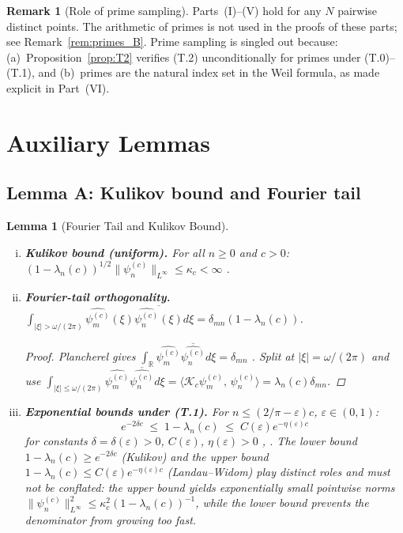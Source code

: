 \documentclass[12pt,a4paper]{amsart}
\newtheorem{lemma}[theorem]{Lemma}
\theoremstyle{definition}
\newtheorem{remark}[theorem]{Remark}
\newcommand{\Kop}{\mathcal{K}_c}
\newcommand{\Kul}{\kappa_c}
\newcommand{\psin}{\psi_n^{(c)}}
\newcommand{\norm}[1]{\|#1\|}
\newcommand{\ip}[2]{\langle #1,\, #2\rangle}
\begin{document}
\begin{remark}[Role of prime sampling]\label{rem:primes}
Parts~(I)--(V) hold for any $N$ pairwise distinct points.
The arithmetic of primes is not used in the proofs of these parts;
see Remark~\ref{rem:primes_B}.
Prime sampling is singled out because: (a)~Proposition~\ref{prop:T2}
verifies (T.2) unconditionally for primes under (T.0)--(T.1), and
(b)~primes are the natural index set in the Weil formula, as made
explicit in Part~(VI).
\end{remark}

\section{Auxiliary Lemmas}\label{sec:lemmas}

\subsection{Lemma A: Kulikov bound and Fourier tail}

\begin{lemma}[Fourier Tail and Kulikov Bound]\label{lem:A}
\begin{enumerate}[(i)]
\item \textbf{Kulikov bound (uniform).}
For all $n\geq0$ and $c>0$:
$(1-\lambda_n(c))^{1/2}\norm{\psin}_{L^\infty}\leq\Kul<\infty$
\cite[Thm.~1.1]{Kulikov2023}.

\item \textbf{Fourier-tail orthogonality.}
$\displaystyle
\int_{|\xi|>\omega/(2\pi)}
\widehat{\psi_m^{(c)}}(\xi)\overline{\widehat{\psi_n^{(c)}}(\xi)}d\xi
=\delta_{mn}(1-\lambda_n(c))$.
\begin{proof}
Plancherel gives $\int_{\mathbb{R}}\widehat{\psi_m^{(c)}}
\overline{\widehat{\psi_n^{(c)}}}d\xi=\delta_{mn}$
\cite[Thm.~S]{BonamiKaroui}.
Split at $|\xi|=\omega/(2\pi)$ and use
$\int_{|\xi|\leq\omega/(2\pi)}\widehat{\psi_m^{(c)}}
\overline{\widehat{\psi_n^{(c)}}}d\xi
=\ip{\Kop\psi_m^{(c)}}{\psi_n^{(c)}}=\lambda_n(c)\delta_{mn}$.
\end{proof}

\item \textbf{Exponential bounds under (T.1).}
For $n\leq(2/\pi-\varepsilon)c$, $\varepsilon\in(0,1)$:
\[
  e^{-2\delta c}\;\leq\;1-\lambda_n(c)\;\leq\;C(\varepsilon)e^{-\eta(\varepsilon)c}
\]
for constants $\delta=\delta(\varepsilon)>0$, $C(\varepsilon)$, $\eta(\varepsilon)>0$
\cite[Thm.~1.1]{Kulikov2023}, \cite{Slepian1978}.
The lower bound $1-\lambda_n(c)\geq e^{-2\delta c}$ (Kulikov)
and the upper bound $1-\lambda_n(c)\leq C(\varepsilon)e^{-\eta(\varepsilon)c}$
(Landau--Widom) play distinct roles and must not be conflated:
the upper bound yields exponentially small pointwise norms
$\norm{\psin}_{L^\infty}^2\leq\Kul^2(1-\lambda_n(c))^{-1}$,
while the lower bound prevents the denominator from growing too fast.
\end{enumerate}
\end{lemma}
\end{document}
